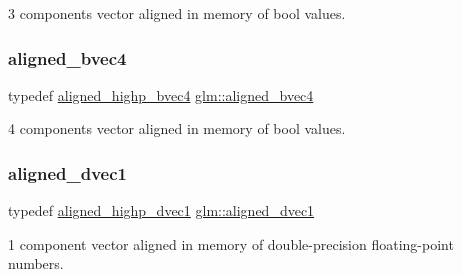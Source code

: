 3 components vector aligned in memory of bool values. 

\mbox{\label{group__gtc__type__aligned_gaa62e46e15c76ced942cdeba89776c5f6}} 
\subsubsection{\texorpdfstring{aligned\+\_\+bvec4}{aligned\_bvec4}}
{\footnotesize\ttfamily typedef \hyperlink{group__gtc__type__aligned_ga833e4cd7402677f8ca56795a12d8bec0}{aligned\+\_\+highp\+\_\+bvec4} \hyperlink{group__gtc__type__aligned_gaa62e46e15c76ced942cdeba89776c5f6}{glm\+::aligned\+\_\+bvec4}}



4 components vector aligned in memory of bool values. 

\mbox{\label{group__gtc__type__aligned_ga81fe4410dc880770293c53fcba83c9e4}} 
\subsubsection{\texorpdfstring{aligned\+\_\+dvec1}{aligned\_dvec1}}
{\footnotesize\ttfamily typedef \hyperlink{group__gtc__type__aligned_ga85671dcb7eef983b5035273fe78dd963}{aligned\+\_\+highp\+\_\+dvec1} \hyperlink{group__gtc__type__aligned_ga81fe4410dc880770293c53fcba83c9e4}{glm\+::aligned\+\_\+dvec1}}



1 component vector aligned in memory of double-\/precision floating-\/point numbers. 

\mbox{\label{group__gtc__type__aligned_ga1e6972e837bc34b3424af8d63a71d7c6}} 
